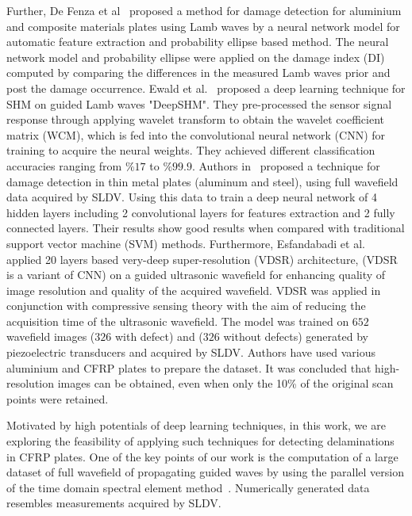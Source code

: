 \documentclass[preprint,9pt]{elsarticle}
\begin{document}
 Further, De Fenza et al~\cite{de2015application} proposed a method for damage detection for aluminium and composite materials plates using Lamb waves by a neural network model for automatic feature extraction and probability ellipse based method. 
 The neural network model and probability ellipse were applied on the damage index (DI) computed by comparing the differences in the measured  Lamb waves prior and post the damage occurrence. 
 Ewald et al.~\cite{ewald2019deepshm} proposed a deep learning technique for SHM on guided Lamb waves "DeepSHM". 
 They pre-processed the sensor signal response through applying wavelet transform to obtain the wavelet coefficient matrix (WCM), which is fed into the convolutional neural network (CNN) for training to acquire the neural weights. 
 They achieved different classification accuracies ranging from \(\%17\) to \(\%99.9\).
 Authors in~\cite{Melville2018} proposed a technique for damage detection in thin metal plates (aluminum and steel), using full wavefield data acquired by SLDV. 
 Using this data to train a deep neural network of 4 hidden layers including 2 convolutional layers for features extraction and 2 fully connected layers. 
 Their results show good results when compared with traditional support vector machine (SVM) methods.
Furthermore, Esfandabadi et al.~\cite{esfandabadideep} applied 20 layers based very-deep super-resolution (VDSR) architecture, (VDSR is a variant of CNN) on a guided ultrasonic wavefield for enhancing quality of image resolution and quality of the acquired wavefield. 
VDSR was applied in conjunction with compressive sensing theory with the aim of reducing the acquisition time of the ultrasonic wavefield.
The model was trained on \(652\) wavefield images (\(326\) with defect) and (\(326\) without defects) generated by piezoelectric transducers and acquired by SLDV. 
Authors have used various aluminium and CFRP plates to prepare the dataset.
It was concluded that high-resolution images can be obtained, even when only the 10\% of the original scan points were retained.

Motivated by high potentials of deep learning techniques, in this work, we are exploring the feasibility of applying such techniques for detecting delaminations in CFRP plates. 
One of the key points of our work is the computation of a large dataset of full wavefield of propagating guided waves by using the parallel version of the time domain spectral element method~\cite{Kudela2020}. 
Numerically generated data resembles measurements acquired by SLDV. 
	
\end{document}

